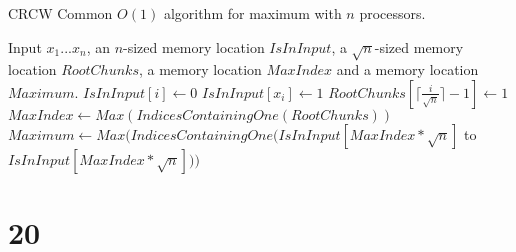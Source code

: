 \documentclass[letterpaper,notitlepage,twoside]{article}
\begin{document}
\begin{algorithm}[H]
  \begin{algorithmic}%
    \caption{CRCW Common $O(1)$ algorithm for maximum with $n$ processors.}
    \Require Input $x_1...x_n$, an $n$-sized memory location $IsInInput$, a $\sqrt{n}$-sized memory location $RootChunks$, a memory location $MaxIndex$ and a memory location $Maximum$.
    \State $IsInInput[i] \gets 0$ 
    \State $IsInInput[x_i] \gets 1$ 
        \State $RootChunks[\lceil \frac{i}{\sqrt{n}} \rceil -1] \gets 1$ 
    \EndIf
    \State $MaxIndex \gets Max(IndicesContainingOne(RootChunks))$ 
    \State $Maximum \gets Max(IndicesContainingOne(IsInInput[MaxIndex*\sqrt{n}]$ to $IsInInput[MaxIndex*\sqrt{n}]))$
  \end{algorithmic}
\end{algorithm}

\section*{20}
\end{document}
